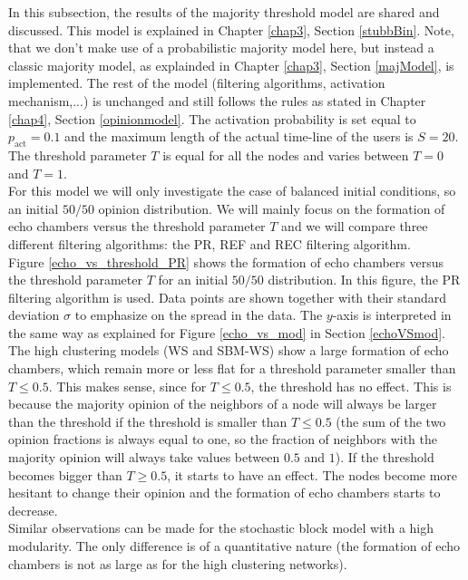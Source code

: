 \documentclass[11 pt , letterpaper , twoside , openright]{book}
\begin{document}
In this subsection, the results of the majority threshold model are shared and discussed. This model is explained in Chapter \ref{chap3}, Section \ref{stubbBin}. Note, that we don't make use of a probabilistic majority model here, but instead a classic majority model, as explainded in Chapter \ref{chap3}, Section \ref{majModel}, is implemented. The rest of the model (filtering algorithms, activation mechanism,...) is unchanged and still follows the rules as stated in Chapter \ref{chap4}, Section \ref{opinionmodel}. The activation probability is set equal to $p_{\text{act}} = 0.1$ and the maximum length of the actual time-line of the users is $S=20$. The threshold parameter $T$ is equal for all the nodes and varies between $T=0$ and $T=1$.\\
For this model we will only investigate the case of balanced initial conditions, so an initial $50/50$ opinion distribution. We will mainly focus on the formation of echo chambers versus the threshold parameter $T$ and we will compare three different filtering algorithms: the PR, REF and REC filtering algorithm. \\
\newline
Figure \ref{echo_vs_threshold_PR} shows the formation of echo chambers versus the threshold parameter $T$ for an initial $50/50$ distribution. In this figure, the PR filtering algorithm is used. Data points are shown together with their standard deviation $\sigma$ to emphasize on the spread in the data. The $y$-axis is interpreted in the same way as explained for Figure \ref{echo_vs_mod} in Section \ref{echoVSmod}.\\
The high clustering models (WS and SBM-WS) show a large formation of echo chambers, which remain more or less flat for a threshold parameter smaller than $T \leqslant 0.5$. This makes sense, since for $T \leqslant 0.5$, the threshold has no effect. This is because the majority opinion of the neighbors of a node will always be larger than the threshold if the threshold is smaller than $T \leqslant 0.5$ (the sum of the two opinion fractions is always equal to one, so the fraction of neighbors with the majority opinion will always take values between $0.5$ and $1$). If the threshold becomes bigger than $T \geqslant 0.5$, it starts to have an effect. The nodes become more hesitant to change their opinion and the formation of echo chambers starts to decrease.\\
Similar observations can be made for the stochastic block model with a high modularity. The only difference is of a quantitative nature (the formation of echo chambers is not as large as for the high clustering networks).\\
\end{document}
